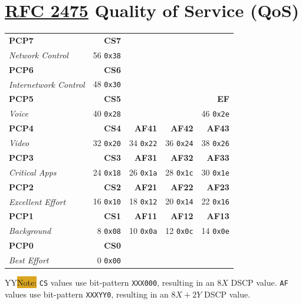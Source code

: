 \documentclass[12pt]{article}
\newcommand{\printColor}{Y}								%
\newcommand{\note}[1]{\if\printColor Y{\colorbox{#1}{Note:}}\else{\underline{Note:}}\fi}
\newcommand{\RFC}[1]{\href{https://datatracker.ietf.org/doc/html/rfc#1}{RFC #1}}
\begin{document}
\section[RFC 2475 QoS]{\RFC{2475} Quality of Service (QoS) \label{sec:QOS}}
	\begin{table}[H]
	\centering
	\begin{tabular}{ l r r r r }
	\textbf{PCP7}			& \textbf{CS7}	&			&			&\\
	\textit{Network Control}	& 56 \texttt{0x38}	&			&			&\\
	\textbf{PCP6}			& \textbf{CS6}	&			&			&\\
	\textit{Internetwork Control}	& 48 \texttt{0x30}	&			&			&\\
	\textbf{PCP5}			& \textbf{CS5}	&			&			& \textbf{EF}\\
	\textit{Voice}			& 40 \texttt{0x28}	&			&			& 46 \texttt{0x2e}\\
	\textbf{PCP4}			& \textbf{CS4}	& \textbf{AF41}	& \textbf{AF42}	& \textbf{AF43}\\
	\textit{Video}			& 32 \texttt{0x20} & 34 \texttt{0x22} & 36 \texttt{0x24} & 38 \texttt{0x26}\\
	\textbf{PCP3}			& \textbf{CS3}	& \textbf{AF31}	& \textbf{AF32}	& \textbf{AF33}\\
	\textit{Critical Apps}		& 24 \texttt{0x18} & 26 \texttt{0x1a} & 28 \texttt{0x1c} & 30 \texttt{0x1e}\\
	\textbf{PCP2}			& \textbf{CS2}	& \textbf{AF21}	& \textbf{AF22}	& \textbf{AF23}\\
	\textit{Excellent Effort}		& 16 \texttt{0x10} & 18 \texttt{0x12} & 20 \texttt{0x14} & 22 \texttt{0x16}\\
	\textbf{PCP1}			& \textbf{CS1}	& \textbf{AF11}	& \textbf{AF12}	& \textbf{AF13}\\
	\textit{Background}		& 8 \texttt{0x08} & 10 \texttt{0x0a} & 12 \texttt{0x0c} & 14 \texttt{0x0e}\\
	\textbf{PCP0}			& \textbf{CS0}	&			&			&\\
	\textit{Best Effort}			& 0 \texttt{0x00} &			&			&\\
	\end{tabular}\end{table}
	\note{Goldenrod} \texttt{CS} values use bit-pattern \texttt{XXX000}, resulting in an $8X$ DSCP value. \texttt{AF} values use bit-pattern \texttt{XXXYY0}, resulting in an $8X+2Y$ DSCP value.
\end{document}
